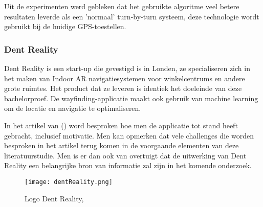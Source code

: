 Uit de experimenten werd gebleken dat het gebruikte algoritme veel betere resultaten leverde als een 'normaal' turn-by-turn systeem, deze technologie wordt gebruikt bij de huidige GPS-toestellen.

\subsubsection{Dent Reality}
Dent Reality is een start-up die gevestigd is in Londen, ze specialiseren zich in het maken van Indoor AR navigatiesystemen voor winkelcentrums en andere grote ruimtes. Het product dat ze leveren is identiek het doeleinde van deze bachelorproef. De wayfinding-applicatie maakt ook gebruik van machine learning om de locatie en navigatie te optimaliseren.

In het artikel van \textcite{Hart2019} () word besproken hoe men de applicatie tot stand heeft gebracht, inclusief motivatie. Men kan opmerken dat vele challenges die worden besproken in het artikel terug komen in de voorgaande elementen van deze literatuurstudie. Men is er dan ook van overtuigt dat de uitwerking van Dent Reality een belangrijke bron van informatie zal zijn in het komende onderzoek.

\begin{figure}[H]
	\centering
	\texttt{[image: dentReality.png]}
	\caption{Logo Dent Reality, \autocite{Hart2019}}
\end{figure}

